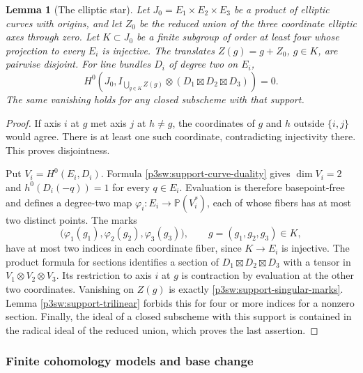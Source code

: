 \documentclass[11pt]{article}
\newtheorem{lemma}[theorem]{Lemma}
\numberwithin{equation}{section}
\begin{document}
\begin{lemma}[The elliptic star]
\label{p3sw:support-elliptic-star}
Let \(J_0=E_1\times E_2\times E_3\) be a product of elliptic curves
with origins, and let \(Z_0\) be the reduced union of the three
coordinate elliptic axes through zero.  Let \(K\subset J_0\) be a
finite subgroup of order at least four whose projection to every
\(E_i\) is injective.  The translates \(Z(g)=g+Z_0\), \(g\in K\),
are pairwise disjoint.  For line bundles \(D_i\) of degree two on
\(E_i\),
\begin{equation}
 H^0\left(J_0,I_{\bigcup_{g\in K}Z(g)}
       \otimes(D_1\boxtimes D_2\boxtimes D_3)\right)=0.
 \label{p3sw:support-star-vanishing}
\end{equation}
The same vanishing holds for any closed subscheme with that support.
\end{lemma}

\begin{proof}
If axis \(i\) at \(g\) met axis \(j\) at \(h\ne g\), the coordinates
of \(g\) and \(h\) outside \(\{i,j\}\) would agree.  There is at least
one such coordinate, contradicting injectivity there.  This proves
disjointness.

Put \(V_i=H^0(E_i,D_i)\).  Formula \eqref{p3sw:support-curve-duality} gives
\(\dim V_i=2\) and \(h^0(D_i(-q))=1\) for every \(q\in E_i\).
Evaluation is therefore basepoint-free and defines a degree-two map
\(\varphi_i:E_i\to\mathbb P(V_i^*)\), each of whose fibers has at most
two distinct points.  The marks
\[
 \bigl(\varphi_1(g_1),\varphi_2(g_2),\varphi_3(g_3)\bigr),
 \qquad g=(g_1,g_2,g_3)\in K,
\]
have at most two indices in each coordinate fiber, since \(K\to E_i\)
is injective.  The product formula for sections identifies a section
of \(D_1\boxtimes D_2\boxtimes D_3\) with a tensor in
\(V_1\otimes V_2\otimes V_3\).  Its restriction to axis \(i\) at \(g\)
is contraction by evaluation at the other two coordinates.  Vanishing
on \(Z(g)\) is exactly \eqref{p3sw:support-singular-marks}.  Lemma
\ref{p3sw:support-trilinear} forbids this for four or more indices for
a nonzero section.  Finally, the ideal of a closed subscheme with
this support is contained in the radical ideal of the reduced union,
which proves the last assertion.
\end{proof}

\subsubsection{Finite cohomology models and base change}
\end{document}
